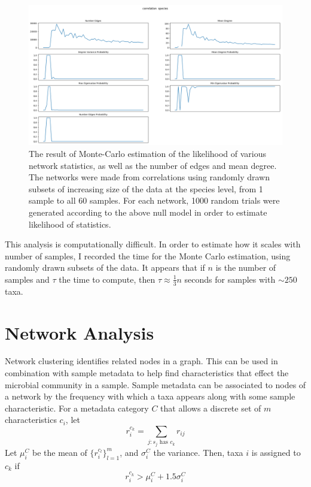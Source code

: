 \documentclass[10pt]{article}
\theoremstyle{definition}
\numberwithin{theorem}{section}
\numberwithin{definition}{section}
\numberwithin{lemma}{section}
\numberwithin{corollary}{section}
\numberwithin{clm}{section}
\numberwithin{rmk}{section}
\begin{document}
\begin{figure}
	\includegraphics[scale = 0.4]{../stat_figs/pears_1000__species.png}
	\caption{The result of Monte-Carlo estimation of the likelihood of various network statistics, as well as the number of edges and mean degree. The networks were made from correlations using randomly drawn subsets of increasing size of the data at the species level, from 1 sample to all 60 samples. For each network, 1000 random trials were generated according to the above null model in order to estimate likelihood of statistics.}\label{montecarlos}
\end{figure}

This analysis is computationally difficult. In order to estimate how it scales with number of samples, I recorded the time for the Monte Carlo estimation, using randomly drawn subsets of the data. It appears that if $n$ is the number of samples and $\tau$ the time to compute, then $\tau \approx \frac{1}{3} n$ seconds for samples with $\sim 250$ taxa. 

\section{Network Analysis}
Network clustering identifies related nodes in a graph. This can be used in combination with sample metadata to help find characteristics that effect the microbial community in a sample. Sample metadata can be associated to nodes of a network by the frequency with which a taxa appears along with some sample characteristic. For a metadata category  $C$ that allows a discrete set of $m$ characteristics $c_i$, let
\[
r_i^{c_k} = \sum_{j:s_j \text{ has } c_k} r_{ij}
\]
Let $\mu_i^C$ be the mean of $\{r_i^{c_l}\}_{l=1}^m$, and $\sigma_i^C$ the variance. Then, taxa $i$ is assigned to $c_k$ if
\[
r_i^{c_k} > \mu_i^C + 1.5\sigma_i^C
\]
\end{document}
